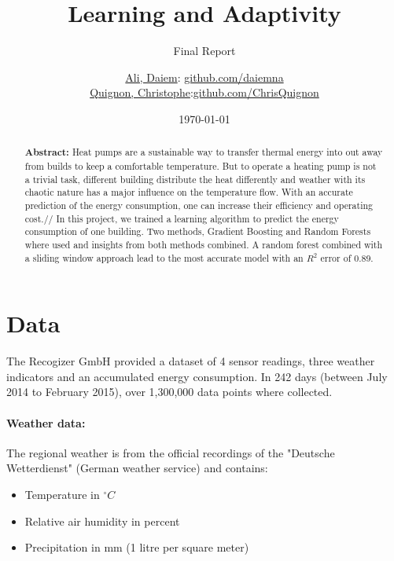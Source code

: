 \documentclass{scrartcl}
\begin{document}
\title{Learning and Adaptivity}
\subtitle{Final Report}
\author{
  \href{daiem.ali@smail.inf.h-brs.de}{Ali, Daiem}: \href{https://github.com/daiemna}{github.com/daiemna}\\
  \href{christophe.quignon@smail.inf.h-brs.de}{Quignon, Christophe}:\href{https://github.com/ChrisQuignon}{github.com/ChrisQuignon}
}
\date{\today}


\maketitle


\begin{abstract}
\textbf{Abstract:}
Heat pumps are a sustainable way to transfer thermal energy into out away from builds to keep a comfortable temperature. But to operate a heating pump is not a trivial task, different building distribute the heat differently and weather with its chaotic nature has a major influence on the temperature flow. With an accurate prediction of the energy consumption, one can increase their efficiency and operating cost.//
In this project, we trained a learning algorithm to predict the energy consumption of one building. Two methods, Gradient Boosting and Random Forests where used and insights from both methods combined. A random forest combined with a sliding window approach lead to the most accurate model with an $R^{2}$ error of 0.89.
\end{abstract}

\section{Data}
\label{sec:data}

The Recogizer GmbH provided a dataset of 4 sensor readings, three weather indicators and an accumulated energy consumption. In 242 days (between July 2014 to February 2015), over 1,300,000 data points where collected.

\paragraph{Weather data:}
The regional weather is from the official recordings of the "Deutsche Wetterdienst" (German weather service) and contains:

\begin{itemize}
\item Temperature in $^\circ C$
\item Relative air humidity in percent
\item Precipitation in mm (1 litre per square meter)
\end{itemize}
\newpage
\end{document}
